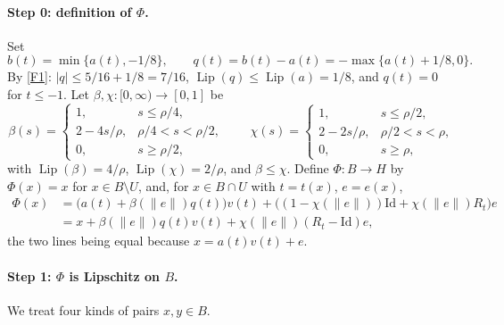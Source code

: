 \documentclass[11pt]{article}
\newcommand{\norm}[1]{\lVert #1\rVert}
\DeclareMathOperator{\Lip}{Lip}
\theoremstyle{definition}
\numberwithin{equation}{section}
\begin{document}
\paragraph{Step 0: definition of \(\Phi\).}
Set
\[
 b(t)=\min\{a(t),-1/8\},\qquad
 q(t)=b(t)-a(t)=-\max\{a(t)+1/8,0\}.
\]
By \ref{F1}: \(|q|\le5/16+1/8=7/16\), \(\Lip(q)\le\Lip(a)=1/8\), and
\(q(t)=0\) for \(t\le-1\). Let \(\beta,\chi:[0,\infty)\to[0,1]\) be
\[
 \beta(s)=
 \begin{cases}
 1,&s\le\rho/4,\\
 2-4s/\rho,&\rho/4<s<\rho/2,\\
 0,&s\ge\rho/2,
 \end{cases}
 \qquad
 \chi(s)=
 \begin{cases}
 1,&s\le\rho/2,\\
 2-2s/\rho,&\rho/2<s<\rho,\\
 0,&s\ge\rho,
 \end{cases}
\]
with \(\Lip(\beta)=4/\rho\), \(\Lip(\chi)=2/\rho\), and \(\beta\le\chi\).
Define \(\Phi:B\to H\) by \(\Phi(x)=x\) for \(x\in B\setminus U\), and, for
\(x\in B\cap U\) with \(t=t(x)\), \(e=e(x)\),
\begin{equation}\label{aux:G}
 \begin{split}
 \Phi(x)&=\bigl(a(t)+\beta(\norm e)q(t)\bigr)v(t)
       +\bigl((1-\chi(\norm e))\mathrm{Id}+\chi(\norm e)R_t\bigr)e\\
 &=x+\beta(\norm e)q(t)v(t)+\chi(\norm e)(R_t-\mathrm{Id})e ,
 \end{split}
\end{equation}
the two lines being equal because \(x=a(t)v(t)+e\).

\paragraph{Step 1: \(\Phi\) is Lipschitz on \(B\).}
We treat four kinds of pairs \(x,y\in B\).
\end{document}
